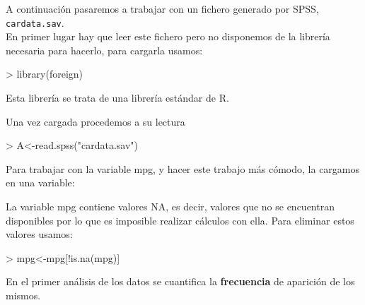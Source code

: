 \documentclass [a4paper] {article}
\begin{document}
\bigskip
A continuaci\'on pasaremos a trabajar con un fichero generado por SPSS, 
\texttt{cardata.sav}.\\

\bigskip
En primer lugar hay que leer este fichero pero no disponemos de la librer\'ia
necesaria para hacerlo, para cargarla usamos:
\begin{Schunk}
\begin{Sinput}
> library(foreign)
\end{Sinput}
\end{Schunk}
Esta librer\'ia se trata de una librer\'ia est\'andar de R.

\bigskip
Una vez cargada procedemos a su lectura
\begin{Schunk}
\begin{Sinput}
> A<-read.spss("cardata.sav")
\end{Sinput}
\end{Schunk}

\bigskip
Para trabajar con la variable mpg, y hacer este trabajo m\'as
c\'omodo, la cargamos en una variable:
\begin{Schunk}
\end{Schunk}

\bigskip
La variable mpg contiene valores NA, es decir, valores que no se encuentran disponibles 
por lo que es imposible realizar c\'alculos con ella. Para eliminar estos valores usamos:
\begin{Schunk}
\begin{Sinput}
> mpg<-mpg[!is.na(mpg)]
\end{Sinput}
\end{Schunk}

\bigskip
En el primer an\'alisis de los datos se cuantifica la \textbf{frecuencia}
de aparici\'on de los mismos. 
\end{document}
